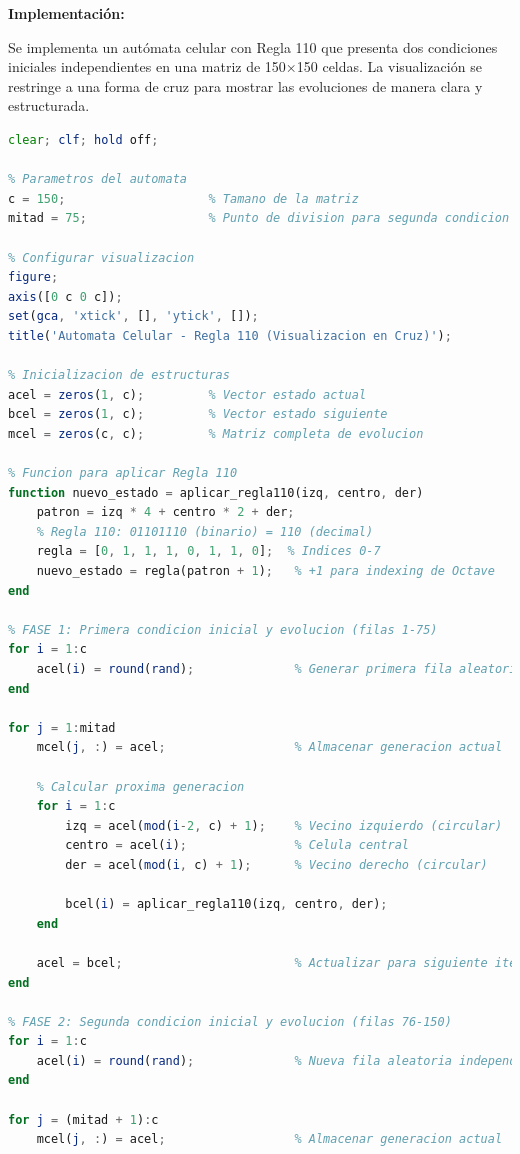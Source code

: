 \documentclass[a4paper,12pt]{article}
\theoremstyle{mytheor}
\begin{document}
\textbf{Implementación:}

Se implementa un autómata celular con Regla 110 que presenta dos condiciones iniciales independientes en una matriz de 150×150 celdas. La visualización se restringe a una forma de cruz para mostrar las evoluciones de manera clara y estructurada.

\begin{lstlisting}[language=Octave, breaklines=true]
clear; clf; hold off;

% Parametros del automata
c = 150;                    % Tamano de la matriz
mitad = 75;                 % Punto de division para segunda condicion inicial

% Configurar visualizacion
figure;
axis([0 c 0 c]);
set(gca, 'xtick', [], 'ytick', []);
title('Automata Celular - Regla 110 (Visualizacion en Cruz)');

% Inicializacion de estructuras
acel = zeros(1, c);         % Vector estado actual
bcel = zeros(1, c);         % Vector estado siguiente  
mcel = zeros(c, c);         % Matriz completa de evolucion

% Funcion para aplicar Regla 110
function nuevo_estado = aplicar_regla110(izq, centro, der)
    patron = izq * 4 + centro * 2 + der;
    % Regla 110: 01101110 (binario) = 110 (decimal)
    regla = [0, 1, 1, 1, 0, 1, 1, 0];  % Indices 0-7
    nuevo_estado = regla(patron + 1);   % +1 para indexing de Octave
end

% FASE 1: Primera condicion inicial y evolucion (filas 1-75)
for i = 1:c
    acel(i) = round(rand);              % Generar primera fila aleatoria
end

for j = 1:mitad
    mcel(j, :) = acel;                  % Almacenar generacion actual
    
    % Calcular proxima generacion
    for i = 1:c
        izq = acel(mod(i-2, c) + 1);    % Vecino izquierdo (circular)
        centro = acel(i);               % Celula central
        der = acel(mod(i, c) + 1);      % Vecino derecho (circular)
        
        bcel(i) = aplicar_regla110(izq, centro, der);
    end
    
    acel = bcel;                        % Actualizar para siguiente iteracion
end

% FASE 2: Segunda condicion inicial y evolucion (filas 76-150)
for i = 1:c
    acel(i) = round(rand);              % Nueva fila aleatoria independiente
end

for j = (mitad + 1):c
    mcel(j, :) = acel;                  % Almacenar generacion actual
    

\end{lstlisting}
\end{document}
